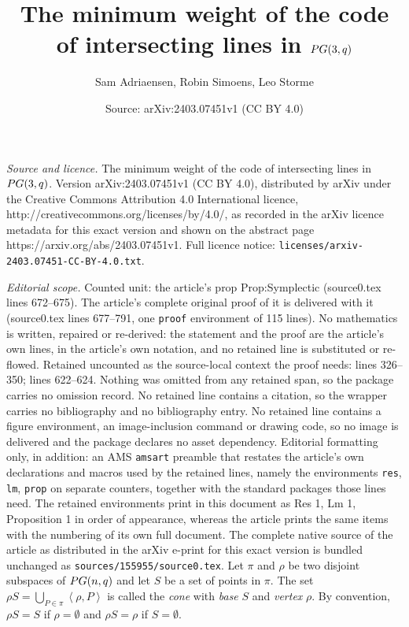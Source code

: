 \documentclass[10pt,a4paper]{amsart}
\title{The minimum weight of the code of intersecting lines in $\pg(3,q)$}
\author{Sam Adriaensen, Robin Simoens, Leo Storme}
\date{Source: arXiv:2403.07451v1 (CC BY 4.0)}
\newcommand{\pg}{\textnormal{PG}}
\newcommand{\vspan}[1]{\left \langle #1 \right \rangle}
\begin{document}
\maketitle

\noindent\emph{Source and licence.} The minimum weight of the code of intersecting lines in $\pg(3,q)$. Version arXiv:2403.07451v1 (CC BY 4.0), distributed by arXiv under the Creative Commons Attribution 4.0 International licence, http://creativecommons.org/licenses/by/4.0/, as recorded in the arXiv licence metadata for this exact version and shown on the abstract page https://arxiv.org/abs/2403.07451v1. Full licence notice: \texttt{licenses/arxiv-2403.07451-CC-BY-4.0.txt}.\par\smallskip

\noindent\textit{Editorial scope.} Counted unit: the article's prop Prop:Symplectic (source0.tex lines 672--675). The article's complete original proof of it is delivered with it (source0.tex lines 677--791, one \texttt{proof} environment of 115 lines). No mathematics is written, repaired or re-derived: the statement and the proof are the article's own lines, in the article's own notation, and no retained line is substituted or re-flowed.  Retained uncounted as the source-local context the proof needs: lines 326--350; lines 622--624.  Nothing was omitted from any retained span, so the package carries no omission record.  No retained line contains a citation, so the wrapper carries no bibliography and no bibliography entry.  No retained line contains a figure environment, an image-inclusion command or drawing code, so no image is delivered and the package declares no asset dependency.  Editorial formatting only, in addition: an AMS \texttt{amsart} preamble that restates the article's own declarations and macros used by the retained lines, namely the environments \texttt{res}, \texttt{lm}, \texttt{prop} on separate counters, together with the standard packages those lines need.  The retained environments print in this document as Res 1, Lm 1, Proposition 1 in order of appearance, whereas the article prints the same items with the numbering of its own full document.  The complete native source of the article as distributed in the arXiv e-print for this exact version is bundled unchanged as \texttt{sources/155955/source0.tex}.
Let $\pi$ and $\rho$ be two disjoint subspaces of $\pg(n,q)$ and let $S$ be a set of points in $\pi$.
The set $\rho S = \bigcup_{P \in \pi} \vspan{\rho,P}$ is called the \emph{cone} with \emph{base} $S$ and \emph{vertex} $\rho$.
By convention, $\rho S = S$ if $\rho = \emptyset$ and $\rho S = \rho$ if $S = \emptyset$.
\end{document}
